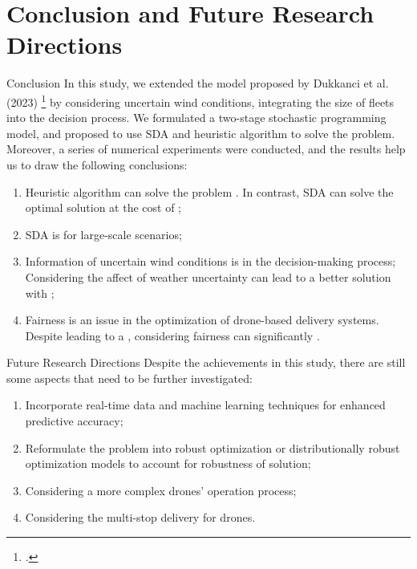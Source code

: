 \documentclass[aspectratio=169]{beamer}
\begin{document}
\section{Conclusion and Future Research Directions}
\begin{frame}{Conclusion}
In this study, we extended the model proposed by Dukkanci et al. (2023) \footcite{dukkanci2023drones} by considering uncertain wind conditions, integrating the size of fleets into the decision process. We formulated a two-stage stochastic programming model, and proposed to use SDA and heuristic algorithm to solve the problem. Moreover, a series of numerical experiments were conducted, and the results help us to draw the following conclusions: 
\small
\begin{enumerate}[label=\arabic*.]
    \item Heuristic algorithm can solve the problem . In contrast, SDA can solve the optimal solution at the cost of ;
    \item SDA is  for large-scale scenarios;
    \item Information of uncertain wind conditions is  in the decision-making process; Considering the affect of weather uncertainty can lead to a better solution with ;
    \item Fairness is an  issue in the optimization of drone-based delivery systems. Despite leading to a , considering fairness can significantly . 
\end{enumerate}  
\end{frame}

\begin{frame}{Future Research Directions}
Despite the achievements in this study, there are still some aspects that need to be further investigated:
    \begin{enumerate}[label=\arabic*.]
        \item Incorporate real-time data and machine learning techniques for enhanced predictive accuracy;
        \item Reformulate the problem into robust optimization or distributionally robust optimization models to account for robustness of solution;
        \item Considering a more complex drones' operation process;
        \item Considering the multi-stop delivery for drones. 
    \end{enumerate}
\end{frame}
\end{document}
